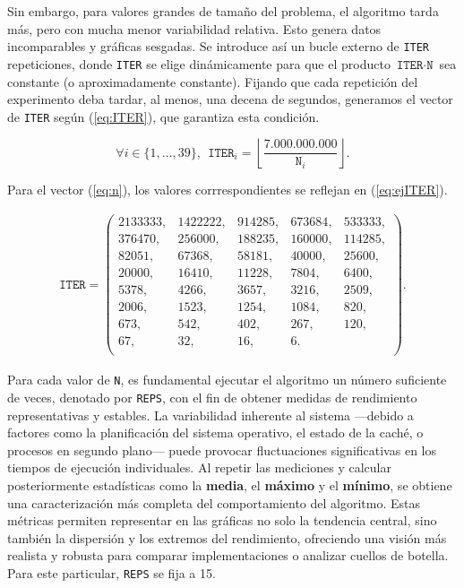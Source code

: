 \documentclass[11pt,a4paper,twoside]{article}
\theoremstyle{definition}
\begin{document}
	Sin embargo, para valores grandes de tamaño del problema, el algoritmo tarda más, pero con mucha menor variabilidad relativa. Esto genera datos incomparables y gráficas sesgadas. Se introduce así un bucle externo de \texttt{ITER} repeticiones, donde \texttt{ITER} se elige dinámicamente para que el producto $\texttt{ITER} \cdot \texttt{N}$ sea constante (o aproximadamente constante). Fijando que cada repetición del experimento deba tardar, al menos, una decena de segundos, generamos el vector de \texttt{ITER} según (\ref{eq:ITER}), que garantiza esta condición.
	
	\begin{equation} \label{eq:ITER}
		\forall i \in \lbrace 1, \dots, 39 \rbrace, \:\: \texttt{ITER}_i = \left\lfloor \dfrac{7.000.000.000}{\texttt{N}_i} \right\rfloor.
	\end{equation}

	Para el vector (\ref{eq:n}), los valores corrrespondientes se reflejan en (\ref{eq:ejITER}).
	
	\begin{equation} \label{eq:ejITER}
		\begin{aligned}
			\texttt{ITER} = \left(
			\begin{matrix}
				2133333, & 1422222, & 914285, & 673684, & 533333, \\
				376470, & 256000, & 188235, & 160000, & 114285, \\
				82051, & 67368, & 58181, & 40000, & 25600, \\
				20000, & 16410, & 11228, & 7804, & 6400, \\
				5378, & 4266, & 3657, & 3216, & 2509, \\
				2006, & 1523, & 1254, & 1084, & 820, \\
				673, & 542, & 402, & 267, & 120, \\
				67, & 32, & 16, & 6. &  \\
			\end{matrix}
			\right).
		\end{aligned}
	\end{equation}

	Para cada valor de \texttt{N}, es fundamental ejecutar el algoritmo un número suficiente de veces, denotado por \texttt{REPS}, con el fin de obtener medidas de rendimiento representativas y estables. La variabilidad inherente al sistema ---debido a factores como la planificación del sistema operativo, el estado de la caché, o procesos en segundo plano--- puede provocar fluctuaciones significativas en los tiempos de ejecución individuales. Al repetir las mediciones y calcular posteriormente estadísticas como la \textbf{media}, el \textbf{máximo} y el \textbf{mínimo}, se obtiene una caracterización más completa del comportamiento del algoritmo. Estas métricas permiten representar en las gráficas no solo la tendencia central, sino también la dispersión y los extremos del rendimiento, ofreciendo una visión más realista y robusta para comparar implementaciones o analizar cuellos de botella. Para este particular, \texttt{REPS} se fija a 15.
		
\end{document}
